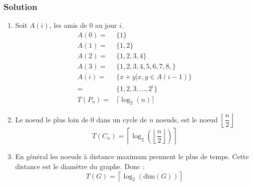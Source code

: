 \subsubsection*{Solution}
\begin{enumerate}

	\item Soit $A(i)$, les amis de $0$ au jour $i$.
\begin{align*}
    A(0) =& \{1 \} \\
    A(1) =& \{1,2 \}\\
    A(2) =& \{1,2,3,4 \}\\
    A(3) =& \{1,2,3,4,5,6,7,8, \}\\
    A(i) =& \{x+y | x,y \in A(i-1) \} \\
         =& \{1,2,3,..., 2^i \} \\
    T(P_n) =& \lceil \log_2 (n) \rceil
\end{align*}


	\item Le noeud le plus loin de $0$ dans un cycle de $n$ noeuds, est le noeud $\left\lfloor \dfrac{n}{2} \right\rfloor$
$$ T(C_n) = \left\lceil \log_2 \left(\left\lfloor \dfrac{n}{2} \right\rfloor \right) \right\rceil $$

	\item En général les noeuds à distance maximum prennent le plus de temps. Cette distance est le diamètre du graphe. Donc : 
$$ T(G) = \left\lceil \log_2 \left( \text{dim}(G) \right) \right\rceil $$


\end{enumerate}
% 
% 
% 
% 
% 
